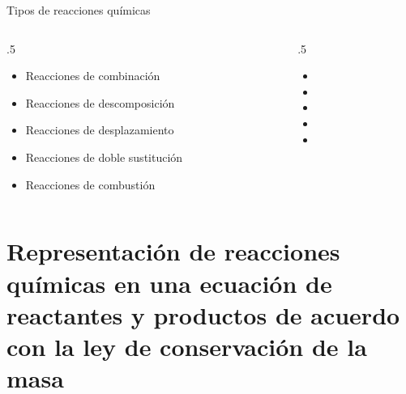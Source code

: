 \documentclass[11pt, aspectratio=169, xcolor=table]{beamer}
\begin{document}
\begin{frame}{Tipos de reacciones químicas}
	\begin{columns}
		\begin{column}{.5\textwidth}
			\begin{itemize}
				\item<1-> Reacciones de combinación
				\item<2-> Reacciones de descomposición
				\item<3-> Reacciones de desplazamiento
				\item<4-> Reacciones de doble sustitución
				\item<5-> Reacciones de combustión
			\end{itemize}
		\end{column}

		\begin{column}{.5\textwidth}
			\begin{itemize}
				\item<1-> 
				\item<2-> 
				\item<3-> 
				\item<4-> 
				\item<5-> 
			\end{itemize}
		\end{column}
	\end{columns}
\end{frame}


\section{Representación de reacciones químicas en una ecuación de reactantes y productos de acuerdo con la ley de conservación de la masa}
\end{document}
